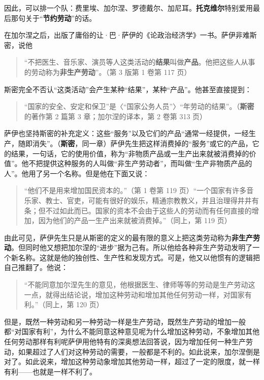 
因此，可以排一个队：费里埃、加尔涅、罗德戴尔、加尼耳。\textbf{托克维尔}特别爱用最后那句关于“\textbf{节约劳动}”的话。


在加尔涅之后，出版了庸俗的让·巴·萨伊的《论政治经济学》一书。萨伊非难斯密，说他

\begin{quote}“不把医生、音乐家、演员等人这类活动的\textbf{结果}叫做\textbf{产品}。他把这些人从事的劳动称为\textbf{非生产劳动}”。（第 3 版第 1 卷第 117 页）\end{quote}

斯密完全不否认“这类活动”会产生某种“结果”，某种“产品”。他甚至直接提到：

\begin{quote}“国家的安全、安定和保卫”是〈“国家公务人员”〉“年劳动的结果”。（\textbf{斯密}的著作第 2 篇第 3 章；加尔涅的译本，第 2 卷第 313 页）\end{quote}

萨伊也坚持斯密的补充定义：这些“服务”以及它们的产品“通常一经提供，一经生产，随即消失”。（\textbf{斯密}，同一章）萨伊先生把这样消费掉的“服务”或它的产品，它的结果，一句话，它的使用价值，称为“非物质产品或一生产出来就被消费掉的价值”。他不把提供这种服务的人叫做“非生产劳动者”，而叫做“生产非物质产品的人”。他用了另一个名称。但是他在下面又说：

\begin{quote}“他们不是用来增加国民资本的。”（第 1 卷第 119 页）“一个国家有许多音乐家、教士、官吏，可能有很好的娱乐，精通宗教教义，并且治理得井井有条；但不过如此而已。国家的资本不会由于这些人的劳动而有任何直接的增加，因为他们的产品一生产出来就被消费掉。”（同上，第 119 页）\end{quote}

由此可见，萨伊先生只是从斯密的定义的最有限的意义上把这类劳动称为\textbf{非生产劳动}。但同时他又想把加尔涅的“进步”据为己有。所以他给各种非生产劳动发明了一个新名称。这就是他的独创性、生产性和发现方式。可是，他又以他惯有的逻辑把自己推翻了。他说：

\begin{quote}“不能同意加尔涅先生的意见，他根据医生、律师等等的劳动是生产劳动这一点，就得出结论说，增加这种劳动和增加其他任何劳动一样，对国家有利。”（同上，第 120 页）\end{quote}

但是，既然一种劳动和另一种劳动一样是生产劳动，既然生产劳动的增加一般都“对国家有利”，为什么不能同意这种意见呢为什么增加这种劳动，不象增加其他任何劳动那样有利呢萨伊用他特有的深奥想法回答说，因为增加任何一种生产劳动，如果超过了人们对这种劳动的需要，一般都是不利的。如此说来，加尔涅倒是对了。如此说来，增加这种劳动象增加其他劳动一样，超过了一定的限度，就一样有利——也就是一样不利了。

